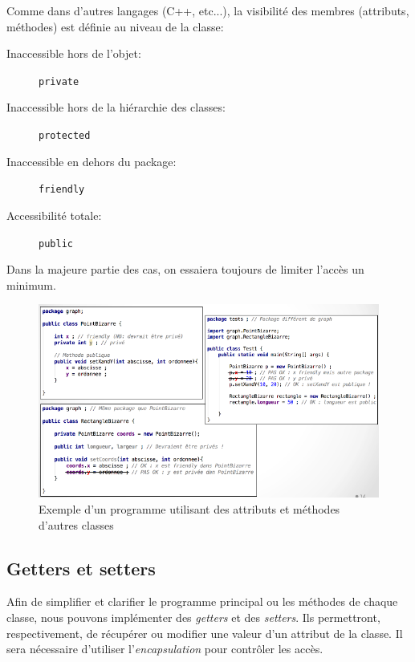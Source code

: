 		Comme dans d'autres langages (C++, etc...), la visibilité des membres (attributs, méthodes) est définie au niveau de la classe:
		\begin{description}
			\item[Inaccessible hors de l'objet:] \lstinline|private|
			\item[Inaccessible hors de la hiérarchie des classes:] \lstinline|protected|
			\item[Inaccessible en dehors du package:] \lstinline|friendly|
			\item[Accessibilité totale:] \lstinline|public| 
		\end{description}
	
		Dans la majeure partie des cas, on essaiera toujours de limiter l'accès un minimum. 
		
		\begin{figure}[h!]
			\centering
			\includegraphics[width=1.0\linewidth]{images/accesmembres}
			\caption[Utilisation attributs et méthodes d'autres classes]{Exemple d'un programme utilisant des attributs et méthodes d'autres classes}
			\label{fig:accesmembres}
		\end{figure}
	
		\subsection{Getters et setters}
		
			Afin de simplifier et clarifier le programme principal ou les méthodes de chaque classe, nous pouvons implémenter des \emph{getters} et des \emph{setters}. Ils permettront, respectivement, de récupérer ou modifier une valeur d'un attribut de la classe.
			Il sera nécessaire d'utiliser l'\emph{encapsulation} pour contrôler les accès.
			
